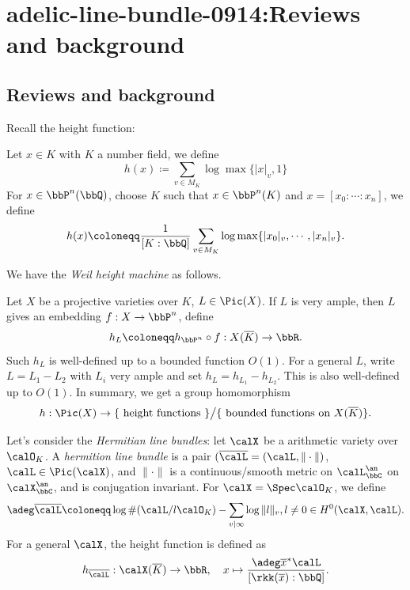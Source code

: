 \section{adelic-line-bundle-0914:Reviews and background}


\subsection[status=draft,tag=0000000,label=\labelNFM{subsec:reviews}]{Reviews and background}

Recall the height function:

\begin{definition}[label=\labelNFM{def:naive-height}, status=draft, tag=0000000]
	Let $x \in K$ with $K$ a number field, we define
	\[ h(x) \coloneqq \sum_{v \in M_K} \log \max \{ |x|_v, 1 \} \]
	For $x \in \bbP^n(\bbQ)$, choose $K$ such that $x \in \bbP^n(K)$ and $x = [x_0: \cdots :x_n]$, we define
	\[ h(x) \coloneqq \frac{1}{[K:\bbQ]} \sum_{v \in M_K} \log \max \{|x_0|_v,\cdots,|x_n|_v\}. \]
\end{definition}

We have the \emph{Weil height machine} as follows.

Let $X$ be a projective varieties over $K$, $L \in \Pic(X)$.
If $L$ is very ample, then $L$ gives an embedding $f: X \to \bbP^n$, define
\[ h_L \coloneqq h_{\bbP^n} \circ f: X(\overline{K}) \to \bbR. \]
Such $h_L$ is well-defined up to a bounded function $O(1)$.
For a general $L$, write $L = L_1 - L_2$ with $L_i$ very ample and set $h_L = h_{L_1} - h_{L_2}$.
This is also well-defined up to $O(1)$.
In summary, we get a group homomorphism
\[ h: \Pic(X) \to \{\text{ height functions }\} \big/ \{\text{ bounded functions on } X(\overline{K})\}. \]

Let's consider the \emph{Hermitian line bundles}:
let $\calX$ be a arithmetic variety over $\calO_K$.
A \emph{hermition line bundle} is a pair $(\overline{\calL} = (\calL,\|\cdot\|)$, $\calL \in \Pic(\calX)$, and $\|\cdot\|$ is a continuous/smooth metric on $\calL_\bbC^\an$ on $\calX_\bbC^\an$, and is conjugation invariant.
For $\calX = \Spec \calO_K$, we define
\[ \adeg \overline{\calL} \coloneqq \log \#(\calL / l\calO_K) - \sum_{v | \infty} \log \|l\|_v, l \neq 0 \in H^0(\calX,\calL). \]
For a general $\calX$, the height function is defined as
\[ h_{\overline{\calL}}: \calX(\overline{K}) \to \bbR, \quad x \mapsto \frac{\adeg \overline{x}^*\calL}{[\rkk(\overline{x}):\bbQ]}. \]

